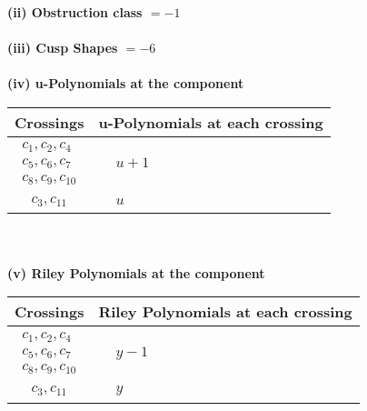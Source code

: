 \documentclass[1p]{elsarticle_modified}
\theoremstyle{definition}
\begin{document}
\flushleft \textbf{(ii) Obstruction class $= -1$}\\~\\
\flushleft \textbf{(iii) Cusp Shapes $= -6$}\\~\\
\newpage\renewcommand{\arraystretch}{1}
\flushleft \textbf{(iv) u-Polynomials at the component}\newline \\
\begin{tabular}{m{50pt}|m{274pt}}
Crossings & \hspace{64pt}u-Polynomials at each crossing \\
\hline $$\begin{aligned}c_{1},c_{2},c_{4}\\c_{5},c_{6},c_{7}\\c_{8},c_{9},c_{10}\end{aligned}$$&$\begin{aligned}
&u+1
\end{aligned}$\\
\hline $$\begin{aligned}c_{3},c_{11}\end{aligned}$$&$\begin{aligned}
&u
\end{aligned}$\\
\hline
\end{tabular}\\~\\
\newpage\renewcommand{\arraystretch}{1}
\flushleft \textbf{(v) Riley Polynomials at the component}\newline \\
\begin{tabular}{m{50pt}|m{274pt}}
Crossings & \hspace{64pt}Riley Polynomials at each crossing \\
\hline $$\begin{aligned}c_{1},c_{2},c_{4}\\c_{5},c_{6},c_{7}\\c_{8},c_{9},c_{10}\end{aligned}$$&$\begin{aligned}
&y-1
\end{aligned}$\\
\hline $$\begin{aligned}c_{3},c_{11}\end{aligned}$$&$\begin{aligned}
&y
\end{aligned}$\\
\hline
\end{tabular}\\~\\
\end{document}
